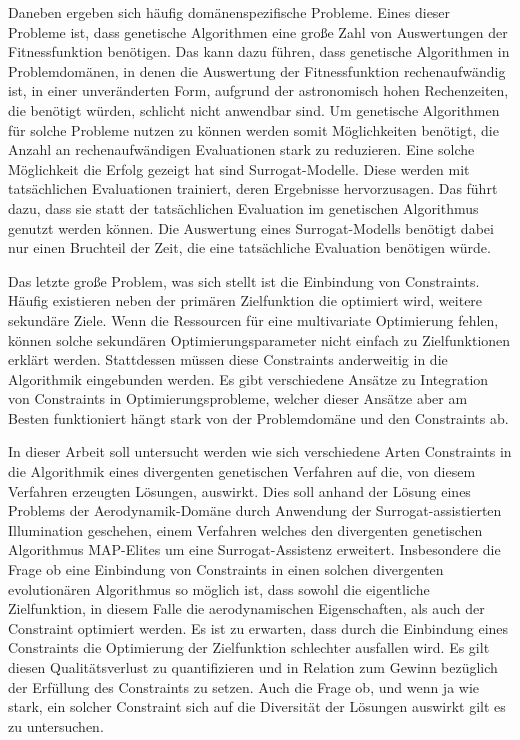 Daneben ergeben sich häufig domänenspezifische Probleme.
Eines dieser Probleme ist, dass genetische Algorithmen eine große Zahl von Auswertungen der Fitnessfunktion benötigen.
Das kann dazu führen, dass genetische Algorithmen in Problemdomänen, in denen die Auswertung der Fitnessfunktion rechenaufwändig ist, in einer unveränderten Form,
aufgrund der astronomisch hohen Rechenzeiten, die benötigt würden, schlicht nicht anwendbar sind.
Um genetische Algorithmen für solche Probleme nutzen zu können werden somit Möglichkeiten benötigt, die Anzahl an rechenaufwändigen Evaluationen stark zu reduzieren.
Eine solche Möglichkeit die Erfolg gezeigt hat sind Surrogat-Modelle.
Diese werden mit tatsächlichen Evaluationen trainiert, deren Ergebnisse hervorzusagen.
Das führt dazu, dass sie statt der tatsächlichen Evaluation im genetischen Algorithmus genutzt werden können.
Die Auswertung eines Surrogat-Modells benötigt dabei nur einen Bruchteil der Zeit, die eine tatsächliche Evaluation benötigen würde.

Das letzte große Problem, was sich stellt ist die Einbindung von Constraints.
Häufig existieren neben der primären Zielfunktion die optimiert wird, weitere sekundäre Ziele.
Wenn die Ressourcen für eine multivariate Optimierung fehlen, können solche sekundären Optimierungsparameter nicht einfach zu Zielfunktionen erklärt werden.
Stattdessen müssen diese Constraints anderweitig in die Algorithmik eingebunden werden.
Es gibt verschiedene Ansätze zu Integration von Constraints in Optimierungsprobleme, welcher dieser Ansätze aber am Besten funktioniert hängt stark von der Problemdomäne und den Constraints ab.

In dieser Arbeit soll untersucht werden wie sich verschiedene Arten Constraints in die Algorithmik eines divergenten genetischen Verfahren auf die, von diesem Verfahren erzeugten Lösungen, auswirkt.
Dies soll anhand der Lösung eines Problems der Aerodynamik-Domäne durch Anwendung der Surrogat-assistierten Illumination geschehen, einem Verfahren welches den divergenten genetischen Algorithmus MAP-Elites um eine Surrogat-Assistenz erweitert.
Insbesondere die Frage ob eine Einbindung von Constraints in einen solchen divergenten evolutionären Algorithmus so möglich ist, dass sowohl die eigentliche Zielfunktion, in diesem Falle die aerodynamischen Eigenschaften, als auch der Constraint optimiert werden.
Es ist zu erwarten, dass durch die Einbindung eines Constraints die Optimierung der Zielfunktion schlechter ausfallen wird.
Es gilt diesen Qualitätsverlust zu quantifizieren und in Relation zum Gewinn bezüglich der Erfüllung des Constraints zu setzen.
Auch die Frage ob, und wenn ja wie stark, ein solcher Constraint sich auf die Diversität der Lösungen auswirkt gilt es zu untersuchen.

